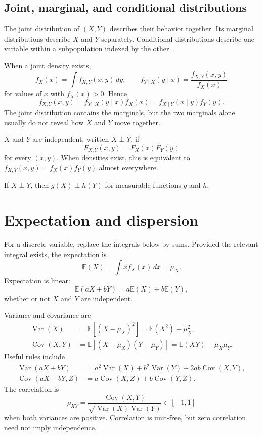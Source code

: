 \subsection{Joint, marginal, and conditional distributions}

The joint distribution of $(X,Y)$ describes their behavior together.  Its
marginal distributions describe $X$ and $Y$ separately.  Conditional
distributions describe one variable within a subpopulation indexed by the
other.

When a joint density exists,
\[
  f_X(x)=\int f_{X,Y}(x,y)\,dy,
  \qquad
  f_{Y\mid X}(y\mid x)=\frac{f_{X,Y}(x,y)}{f_X(x)}
\]
for values of $x$ with $f_X(x)>0$.  Hence
\[
  f_{X,Y}(x,y)=f_{Y\mid X}(y\mid x)f_X(x)
              =f_{X\mid Y}(x\mid y)f_Y(y).
\]
The joint distribution contains the marginals, but the two marginals alone
usually do not reveal how $X$ and $Y$ move together.

\begin{definition}[Independence]
$X$ and $Y$ are independent, written $X\perp Y$, if
\[
  F_{X,Y}(x,y)=F_X(x)F_Y(y)
\]
for every $(x,y)$.  When densities exist, this is equivalent to
$f_{X,Y}(x,y)=f_X(x)f_Y(y)$ almost everywhere.
\end{definition}

If $X\perp Y$, then $g(X)\perp h(Y)$ for measurable functions $g$ and $h$.

\section{Expectation and dispersion}

For a discrete variable, replace the integrals below by sums.  Provided the
relevant integral exists, the expectation is
\[
  \mathbb E(X)=\int x f_X(x)\,dx=\mu_X.
\]
Expectation is linear:
\[
  \mathbb E(aX+bY)=a\mathbb E(X)+b\mathbb E(Y),
\]
whether or not $X$ and $Y$ are independent.

Variance and covariance are
\begin{align*}
  \operatorname{Var}(X)
    &=\mathbb E[(X-\mu_X)^2]
      =\mathbb E(X^2)-\mu_X^2,\\
  \operatorname{Cov}(X,Y)
    &=\mathbb E[(X-\mu_X)(Y-\mu_Y)]
      =\mathbb E(XY)-\mu_X\mu_Y.
\end{align*}
Useful rules include
\begin{align*}
  \operatorname{Var}(aX+bY)
  &=a^2\operatorname{Var}(X)+b^2\operatorname{Var}(Y)
    +2ab\operatorname{Cov}(X,Y),\\
  \operatorname{Cov}(aX+bY,Z)
  &=a\operatorname{Cov}(X,Z)+b\operatorname{Cov}(Y,Z).
\end{align*}
The correlation is
\[
  \rho_{XY}=\frac{\operatorname{Cov}(X,Y)}
  {\sqrt{\operatorname{Var}(X)\operatorname{Var}(Y)}}\in[-1,1]
\]
when both variances are positive.  Correlation is unit-free, but zero
correlation need not imply independence.

